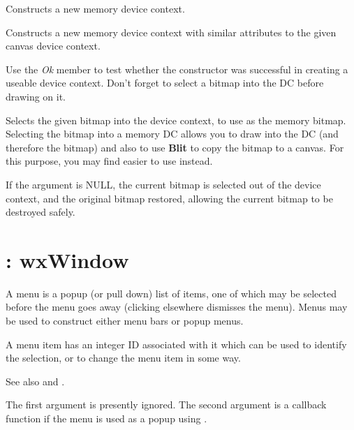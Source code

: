 

Constructs a new memory device context.


Constructs a new memory device context with similar attributes to the
given canvas device context.

Use the {\it Ok} member to test whether the constructor was successful
in creating a useable device context. Don't forget to select a bitmap
into the DC before drawing on it.



Selects the given bitmap into the device context, to use as the memory
bitmap. Selecting the bitmap into a memory DC allows you to draw into
the DC (and therefore the bitmap) and also to use {\bf Blit} to copy
the bitmap to a canvas. For this purpose, you may find \rtfsp
easier to use instead.

If the argument is NULL, the current bitmap is selected out of the device
context, and the original bitmap restored, allowing the current bitmap to
be destroyed safely.

\section{: wxWindow}\label{wxmenu}

A menu is a popup (or pull down) list of items, one of which may be
selected before the menu goes away (clicking elsewhere dismisses the
menu).  Menus may be used to construct either menu bars or popup menus.

A menu item has an integer ID associated with it which can be used to
identify the selection, or to change the menu item in some way.

See also  and .



The first argument is presently ignored. The second argument is 
a callback function if the menu is used as a popup using .

